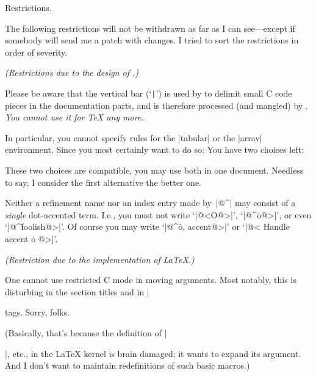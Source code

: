 \chap Restrictions.

The following restrictions will not be withdrawn as far as I can
see---except if somebody will send me a patch with changes. I tried to
sort the restrictions in order of severity.


\sect \emph{(Restrictions due to the design of \cweave{}.)}

Please be aware that the vertical bar (`\verb"|"') is used by \cweb{}
to delimit small C code pieces in the documentation parts, and is
therefore processed (and mangled) by \cweave{}. \emph{You cannot use
it for \TeX{} any more.}

In particular, you cannot specify rules for the |tabular| or the
|array| environment. Since you most certainly want to do so: You have
two choices left:
%
%
These two choices are compatible, you may use both in one document.
Needless to say, I consider the first alternative the better one.


\sect Neither a refinement name nor an index entry made by~|@^| may
consist of a \emph{single} dot-accented term. I.e., you must not
write `|@<\.O@>|', `|@^\.o@>|', or even `|@^\.{foolish}@>|'. Of
course you may write `|@^\.o, accent@>|' or `|@< Handle accent \.o @>|'.


\sect \emph{(Restriction due to the implementation of \LaTeX{}.)}

One cannot use restricted C mode in moving arguments. Most notably,
this is disturbing in the section titles and in |\caption|
tags. Sorry, folks.

(Basically, that's because the definition of |\addcontentsline|, etc.,
in the \LaTeX{} kernel is brain damaged; it wants to expand its
argument. And I don't want to maintain redefinitions of such basic
macros.)


